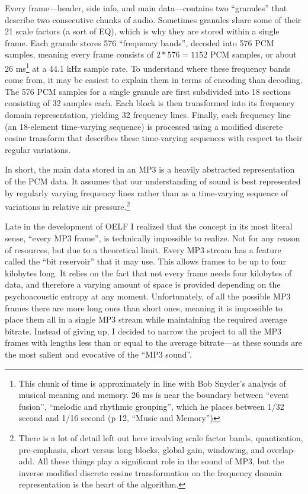 \documentclass{thesis}
\begin{document}
Every frame---header, side info, and main data---contains two ``granules'' that describe two consecutive chunks of audio. Sometimes granules share some of their 21 scale factors (a sort of EQ), which is why they are stored within a single frame. Each granule stores 576 ``frequency bands'', decoded into 576 PCM samples, meaning every frame consists of $2*576=1152$ PCM samples, or about 26 ms\footnote{This chunk of time is approximately in line with Bob Snyder's analysis of musical meaning and memory. 26 ms is near the boundary between ``event fusion'', ``melodic and rhythmic grouping'', which he places between 1/32 second and 1/16 second (p 12, ``Music and Memory'')} at a 44.1 kHz sample rate. To understand where these frequency bands come from, it may be easiest to explain them in terms of encoding than decoding. The 576 PCM samples for a single granule are first subdivided into 18 sections consisting of 32 samples each. Each block is then transformed into its frequency domain representation, yielding 32 frequency lines. Finally, each frequency line (an 18-element time-varying sequence) is processed using a modified discrete cosine transform that describes these time-varying sequences with respect to their regular variations.

In short, the main data stored in an MP3 is a heavily abstracted representation of the PCM data. It assumes that our understanding of sound is best represented by regularly varying frequency lines rather than as a time-varying sequence of variations in relative air pressure.\footnote{There is a lot of detail left out here involving scale factor bands, quantization, pre-emphasis, short versus long blocks, global gain, windowing, and overlap-add. All these things play a significant role in the sound of MP3, but the inverse modified discrete cosine transformation on the frequency domain representation is the heart of the algorithm.}

Late in the development of OELF I realized that the concept in its most literal sense, ``every MP3 frame'', is technically impossible to realize. Not for any reason of resources, but due to a theoretical limit. Every MP3 stream has a feature called the ``bit reservoir'' that it may use. This allows frames to be up to four kilobytes long. It relies on the fact that not every frame needs four kilobytes of data, and therefore a varying amount of space is provided depending on the psychoacoustic entropy at any moment. Unfortunately, of all the possible MP3 frames there are more long ones than short ones, meaning it is impossible to place them all in a single MP3 stream while maintaining the required average bitrate. Instead of giving up, I decided to narrow the project to all the MP3 frames with lengths less than or equal to the average bitrate---as these sounds are the most salient and evocative of the ``MP3 sound''.
	
\end{document}
